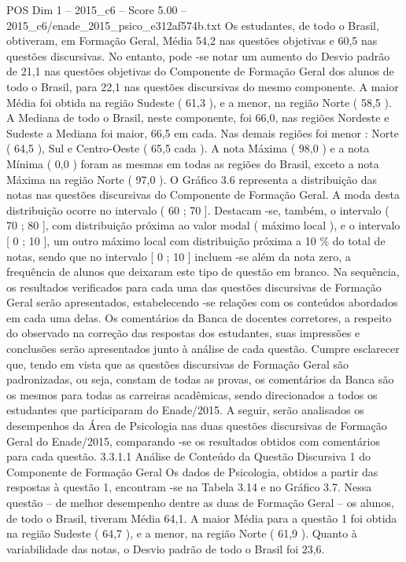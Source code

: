 \begin{textsample}{POS Dim 1 – 2015\_c6 – Score 5.00 – 2015\_c6/enade\_2015\_psico\_e312af574b.txt}
Os estudantes, de todo o Brasil, obtiveram, em Formação Geral, Média 54,2 nas questões objetivas e 60,5 nas questões discursivas.
No entanto, pode -se notar um aumento do Desvio padrão de 21,1 nas questões objetivas do Componente de Formação Geral dos alunos de todo o Brasil, para 22,1 nas questões discursivas do mesmo componente.
A maior Média foi obtida na região Sudeste ( 61,3 ), e a menor, na região Norte ( 58,5 ).
A Mediana de todo o Brasil, neste componente, foi 66,0, nas regiões Nordeste e Sudeste a Mediana foi maior, 66,5 em cada.
Nas demais regiões foi menor : Norte ( 64,5 ), Sul e Centro-Oeste ( 65,5 cada ).
A nota Máxima ( 98,0 ) e a nota Mínima ( 0,0 ) foram as mesmas em todas as regiões do Brasil, exceto a nota Máxima na região Norte ( 97,0 ).
O Gráfico 3.6 representa a distribuição das notas nas questões discursivas do Componente de Formação Geral.
A moda desta distribuição ocorre no intervalo ( 60 ; 70 ].
Destacam -se, também, o intervalo ( 70 ; 80 ], com distribuição próxima ao valor modal ( máximo local ), e o intervalo [ 0 ; 10 ], um outro máximo local com distribuição próxima a 10 \% do total de notas, sendo que no intervalo [ 0 ; 10 ] incluem -se além da nota zero, a frequência de alunos que deixaram este tipo de questão em branco.
Na sequência, os resultados verificados para cada uma das questões discursivas de Formação Geral serão apresentados, estabelecendo -se relações com os conteúdos abordados em cada uma delas.
Os comentários da Banca de docentes corretores, a respeito do observado na correção das respostas dos estudantes, suas impressões e conclusões serão apresentados junto à análise de cada questão.
Cumpre esclarecer que, tendo em vista que as questões discursivas de Formação Geral são padronizadas, ou seja, constam de todas as provas, os comentários da Banca são os mesmos para todas as carreiras acadêmicas, sendo direcionados a todos os estudantes que participaram do Enade/2015.
A seguir, serão analisados os desempenhos da Área de Psicologia nas duas questões discursivas de Formação Geral do Enade/2015, comparando -se os resultados obtidos com comentários para cada questão. 3.3.1.1 Análise de Conteúdo da Questão Discursiva 1 do Componente de Formação Geral Os dados de Psicologia, obtidos a partir das respostas à questão 1, encontram -se na Tabela 3.14 e no Gráfico 3.7.
Nessa questão – de melhor desempenho dentre as duas de Formação Geral – os alunos, de todo o Brasil, tiveram Média 64,1.
A maior Média para a questão 1 foi obtida na região Sudeste ( 64,7 ), e a menor, na região Norte ( 61,9 ).
Quanto à variabilidade das notas, o Desvio padrão de todo o Brasil foi 23,6.

\end{textsample}
